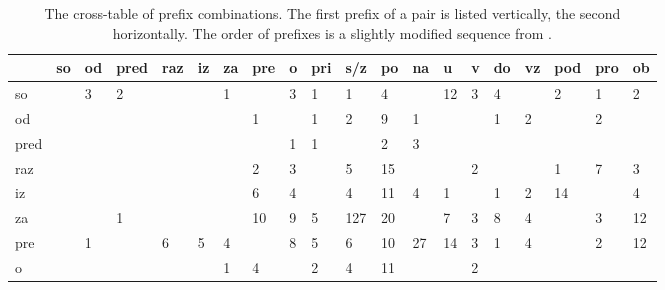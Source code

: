 \documentclass[output=paper,colorlinks,citecolor=brown]{langscibook}
\begin{document}
\begin{table}
\scriptsize
\caption{The cross-table of prefix combinations. The first prefix of a pair is listed vertically, the second horizontally. The order of prefixes is a slightly modified sequence from .}
\label{fig:table1}
\begin{tabularx}{\linewidth}{lXXXXXXXXXXXXXXXXXXX}
&so&	od	&pred&	raz&	iz&	za&	pre&	o&	pri&	s/z&	po&	na&	u&	v&	do&	vz&	pod&	pro&	ob\\ \hline
so&\cellcolor[gray]{0.9}	&\cellcolor{lime}	3&	\cellcolor{lime}2&	&	&	\cellcolor{yellow}1&	&	\cellcolor{lime}3&	\cellcolor{yellow}1&	\cellcolor{yellow}1&	\cellcolor{lime}4&	&	\cellcolor{lime}12&	\cellcolor{lime}3&	\cellcolor{lime}4&	&	\cellcolor{lime}2&	\cellcolor{yellow}1&	\cellcolor{lime}2\\
od&	&\cellcolor[gray]{0.9}	&	&	&	&	&	\cellcolor{yellow}1&	&	\cellcolor{yellow}1&	\cellcolor{lime}2&\cellcolor{lime}	9&	\cellcolor{yellow}1&	&	&	\cellcolor{yellow}1&	\cellcolor{lime}2&	&	\cellcolor{lime}2&	\\
pred&	&	&\cellcolor[gray]{0.9}	&	&	&	&	&	\cellcolor{yellow}1&	\cellcolor{yellow}1&	&	\cellcolor{lime}2&	\cellcolor{lime}3&	&	&	&	&	&	&	\\
raz&	&	&	&\cellcolor[gray]{0.9}	&	&	&	\cellcolor{lime}2&	\cellcolor{lime}3&	&	\cellcolor{lime}5&	\cellcolor{lime}15&	&	&	\cellcolor{lime}2&	&	&	\cellcolor{yellow}1&	\cellcolor{lime}7&	\cellcolor{lime}3\\
iz&	&	&	&	&\cellcolor[gray]{0.9}	&	&	\cellcolor{lime}6&	\cellcolor{lime}4&	&	\cellcolor{lime}4&	\cellcolor{lime}11&	\cellcolor{lime}4&	\cellcolor{yellow}1&	&	\cellcolor{yellow}1&	\cellcolor{lime}2&	\cellcolor{lime}14&	&	\cellcolor{lime}4\\
za&	&	&	\cellcolor{yellow}1&	&	&	\cellcolor[gray]{0.9}&	\cellcolor{lime}10&	\cellcolor{lime}9&	\cellcolor{lime}5&	\cellcolor{lime}127&	\cellcolor{lime}20&	&	\cellcolor{lime}7&	\cellcolor{lime}3&	\cellcolor{lime}8&	\cellcolor{lime}4&	&	\cellcolor{lime}3&	\cellcolor{lime}12\\
pre&	&	\cellcolor{yellow}1&	&	\cellcolor{lime}6&	\cellcolor{lime}5&	\cellcolor{lime}4&\cellcolor[gray]{0.9}	&	\cellcolor{lime}8&\cellcolor{lime}	5&\cellcolor{lime}	6&\cellcolor{lime}	10&\cellcolor{lime}	27&\cellcolor{lime}	14&\cellcolor{lime}	3&	\cellcolor{yellow}1&\cellcolor{lime}	4&	&\cellcolor{lime}	2&\cellcolor{lime}	12\\
o&	&	&	&	&	&	\cellcolor{yellow}1&\cellcolor{lime}	4&\cellcolor[gray]{0.9}	&\cellcolor{lime}	2&\cellcolor{lime}	4&\cellcolor{lime}	11&	&	&	\cellcolor{lime}2&	&	&	&	&	\\

\end{tabularx}
\end{table}
\end{document}
